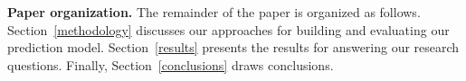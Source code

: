 \textbf{Paper organization.}
The remainder of the paper is organized as follows.
Section~\ref{methodology} discusses our approaches for building and evaluating our prediction model. %
Section~\ref{results} presents the results for answering our research questions.
Finally, Section~\ref{conclusions} draws conclusions.

